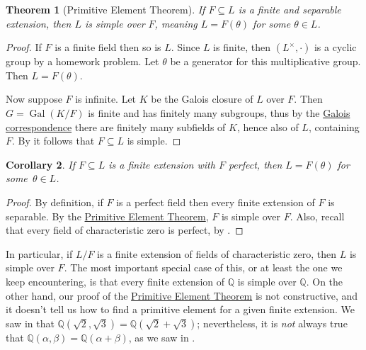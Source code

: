 \documentclass[12pt]{report}
\newtheorem{theorem}{Theorem}[chapter]
\newtheorem{corollary}[theorem]{Corollary}
\numberwithin{equation}{section}
\numberwithin{theorem}{chapter}
\theoremstyle{definition}
\newtheorem*{basic properties}{Basic Properties}
\newtheorem*{Important Remark}{Important Remark}
\DeclareMathOperator{\Gal}{Gal}
\newcommand{\Q}{\mathbb{Q}}
\begin{document}
\begin{theorem}[Primitive Element Theorem]\label{primitive element theorem}
If $F \subseteq L$ is a finite and separable extension, then $L$ is simple over $F$, meaning $L=F(\theta)$ for some $\theta \in L$.\end{theorem}

\begin{proof}
If $F$ is a finite field then so is $L$. Since $L$ is finite, then $(L^\times,\cdot)$ is a cyclic group by a homework problem. Let $\theta$ be a generator for this multiplicative group. Then $L=F(\theta)$.

Now suppose $F$ is infinite. Let $K$ be the Galois closure of $L$ over $F$. Then $G=\Gal(K/F)$ is finite and has finitely many subgroups, thus by the \hyperref[Fundamental Theorem of Galois Theory]{Galois correspondence} there are finitely many subfields of $K$, hence also of $L$, containing $F$. By  it follows that $F \subseteq L$ is simple.
\end{proof}


\begin{corollary}\label{finite extensions of char 0 fields are simple}
	If $F \subseteq L$ is a finite extension with $F$ perfect, then $L=F(\theta)$ for some~$\theta \in L$. 
\end{corollary}

\begin{proof}
	By definition, if $F$ is a perfect field then every finite extension of $F$ is separable. By the \hyperref[primitive element theorem]{Primitive Element Theorem}, $F$ is simple over $F$. Also, recall that every field of characteristic zero is perfect, by .
\end{proof}

In particular, if $L/F$ is a finite extension of fields of characteristic zero, then $L$ is simple over $F$.
The most important special case of this, or at least the one we keep encountering, is that every finite extension of $\Q$ is simple over $\Q$. On the other hand, our proof of the \hyperref[primitive element theorem]{Primitive Element Theorem} is not constructive, and it doesn't tell us how to find a primitive element for a given finite extension. 
We saw in  that $\Q(\sqrt{2},\sqrt{3}) = \Q(\sqrt{2}+\sqrt{3})$; nevertheless, it is \emph{not} always true that $\Q(\alpha, \beta) = \Q(\alpha+\beta)$, as we saw in .
\end{document}
